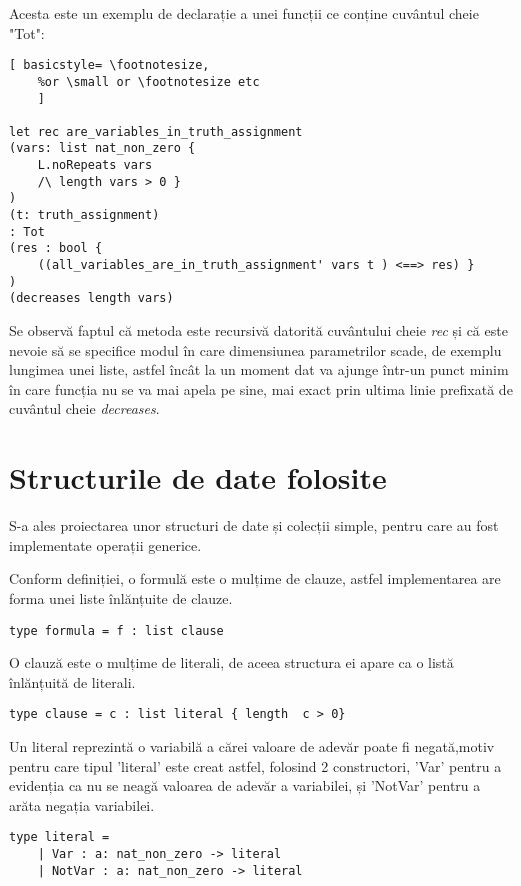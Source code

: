 Acesta este un exemplu de declarație a unei funcții ce conține cuvântul cheie "Tot":

\begin{lstlisting}[	basicstyle= \footnotesize, 
	%or \small or \footnotesize etc
	]

let rec are_variables_in_truth_assignment
(vars: list nat_non_zero { 
	L.noRepeats vars 
	/\ length vars > 0 }
) 
(t: truth_assignment) 
: Tot 
(res : bool { 
	((all_variables_are_in_truth_assignment' vars t ) <==> res) }
) 
(decreases length vars)

\end{lstlisting}

Se observă faptul că metoda este recursivă datorită cuvântului cheie \textit{rec} și că este nevoie să se specifice modul în care dimensiunea parametrilor scade, de exemplu lungimea unei liste, astfel încât la un moment dat va ajunge într-un punct minim în care funcția nu se va mai apela pe sine, mai exact prin ultima linie prefixată de cuvântul cheie \textit{decreases}.

\section{Structurile de date folosite}

S-a ales proiectarea unor structuri de date și colecții simple, pentru care au fost implementate operații generice.

Conform definiției, o formulă este o mulțime de clauze, astfel implementarea are forma unei liste înlănțuite de clauze.

\begin{lstlisting}[]
	type formula = f : list clause 
	\end{lstlisting}

O clauză este o mulțime de literali, de aceea structura ei apare ca o listă înlănțuită de literali.

\begin{lstlisting}[]
	type clause = c : list literal { length  c > 0} 
\end{lstlisting}

Un literal reprezintă o variabilă a cărei valoare de adevăr poate fi negată,\newline  motiv pentru care tipul 'literal' este creat astfel, folosind 2 constructori, 'Var' pentru a evidenția ca nu se neagă valoarea de adevăr a variabilei, și 'NotVar' pentru a arăta negația variabilei.

\begin{lstlisting}[]
type literal = 
	| Var : a: nat_non_zero -> literal
	| NotVar : a: nat_non_zero -> literal
\end{lstlisting}


